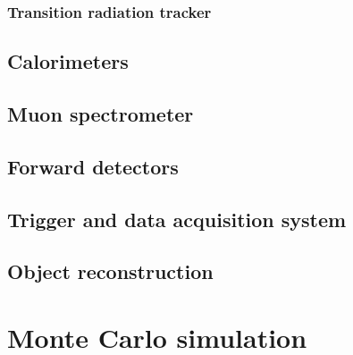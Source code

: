 \subsubsection{Transition radiation tracker}

\subsection{Calorimeters}

\subsection{Muon spectrometer}

\subsection{Forward detectors}

\subsection{Trigger and data acquisition system}

\subsection{Object reconstruction}


\section{Monte Carlo simulation}

